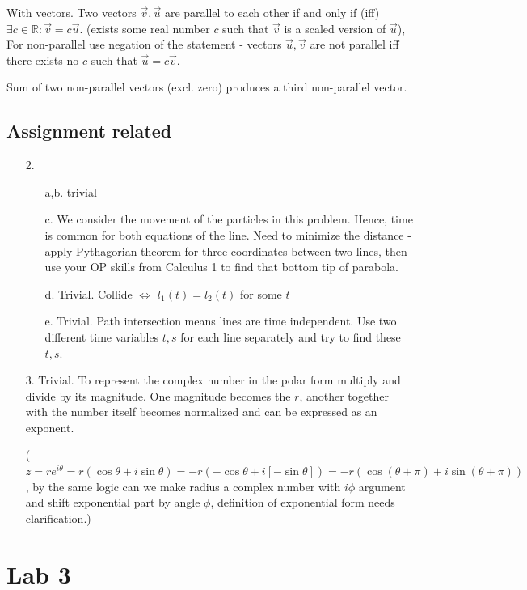 \documentclass{article}
\begin{document}
With vectors. Two vectors $\vec{v},\vec{u}$ are parallel to each other if and only if (iff) $\exists c\in \mathbb{R}: \vec{v}=c\vec{u}$. (exists some real number $c$ such that $\vec{v}$ is a scaled version of $\vec{u}$), For non-parallel use negation of the statement - vectors $\vec{u},\vec{v}$ are not parallel iff there exists no $c$ such that $\vec{u}=c\vec{v}$.

Sum of two non-parallel vectors (excl. zero) produces a third non-parallel vector. 

\subsection{Assignment related}

\begin{enumerate}
  \item[2.]
  \begin{enumerate}
    \item [a,b.] trivial
    \item[c.] We consider the movement of the particles in this problem. Hence, time is common for both equations of the line. Need to minimize the distance - apply Pythagorian theorem for three coordinates between two lines, then use your OP skills from Calculus 1 to find that bottom tip of parabola.
    \item[d.] Trivial. Collide $\iff$ ${l}_1(t)={l}_2(t)$ for some $t$
    \item[e.] Trivial. Path intersection means lines are time independent. Use two different time variables $t,s$ for each line separately and try to find these $t,s$. 
  \end{enumerate}
  \item[3.] Trivial. To represent the complex number in the polar form multiply and divide by its magnitude. One magnitude becomes the $r$, another together with the number itself becomes normalized and can be expressed as an exponent. 
   
  
  ($z=re^{i\theta}=r(\cos\theta+i\sin\theta) =-r(-\cos\theta+i[-\sin\theta])= -r(\cos(\theta+\pi) + i\sin(\theta+\pi))$, by the same logic can we make radius a complex number with $i\phi$ argument and shift exponential part by angle $\phi$, definition of exponential form needs clarification.)
\end{enumerate}

\section{Lab 3}
\end{document}

